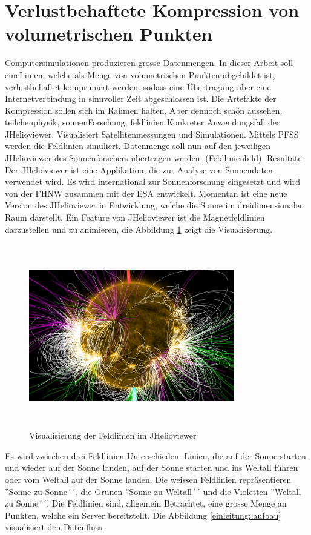 \section{Verlustbehaftete Kompression von volumetrischen Punkten}
Computersimulationen produzieren grosse Datenmengen. 
In dieser Arbeit soll eineLinien, welche als Menge von volumetrischen Punkten abgebildet ist, verlustbehaftet komprimiert werden. sodass eine Übertragung über eine Internetverbindung in sinnvoller Zeit abgeschlossen ist. Die Artefakte der Kompression sollen sich im Rahmen halten. Aber dennoch schön aussehen.\\
[\baselineskip]
teilchenphysik, sonnenForschung, feldlinien Konkreter Anwendungsfall der JHelioviewer. Visualisiert Satellitenmessungen und Simulationen. Mittels PFSS werden die Feldlinien simuliert. Datenmenge soll nun auf den jeweiligen JHelioviewer des Sonnenforschers übertragen werden. (Feldlinienbild). Resultate\\
[\baselineskip]
Der JHelioviewer ist eine Applikation, die zur Analyse von Sonnendaten verwendet wird. Es wird international zur Sonnenforschung eingesetzt und wird von der FHNW zusammen mit der ESA entwickelt. Momentan ist eine neue Version des JHelioviewer in Entwicklung, welche die Sonne im dreidimensionalen Raum darstellt. Ein Feature von JHelioviewer ist die Magnetfeldlinien darzustellen und zu animieren, die Abbildung \ref{einleitung::feldlinien} zeigt die Visualisierung.
\begin{figure}[!htbp]
\center
	\includegraphics[width=0.8\textwidth,height=8cm,keepaspectratio]{./pictures/einleitung/fieldLines.png}
	\caption{Visualisierung der Feldlinien im JHelioviewer}
	\label{einleitung::feldlinien}
\end{figure}
Es wird zwischen drei Feldlinien Unterschieden: Linien, die auf der Sonne starten und wieder auf der Sonne landen, auf der Sonne starten und ins Weltall führen oder vom Weltall auf der Sonne landen. Die weissen Feldlinien repräsentieren ''Sonne zu Sonne´´, die Grünen ''Sonne zu Weltall´´ und die Violetten ''Weltall zu Sonne´´. Die Feldlinien sind, allgemein Betrachtet, eine grosse Menge an Punkten, welche ein Server bereitstellt. Die Abbildung \ref{einleitung::aufbau} visualisiert den Datenfluss.
